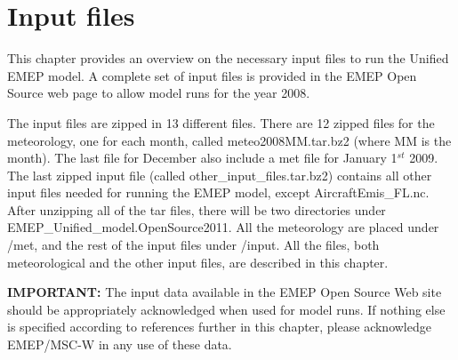 \chapter{Input files}
\label{ch:InputFiles}

This chapter provides an overview on the necessary input files to run 
the Unified EMEP model. A complete set of input files is provided in
the EMEP Open Source web page to allow model runs for the year 2008. 

The input files are zipped in 13 different files. 
There are 12 zipped files for the meteorology, one for each month, called meteo2008MM.tar.bz2 (where MM 
is the month). 
The last file for December also include a met file for January 1$^{st}$ 2009. 
The last zipped input file (called other\_input\_files.tar.bz2) contains all other input 
files needed for running the EMEP model, except AircraftEmis\_FL.nc.
After unzipping all of the tar files, there will be two directories under EMEP\_Unified\_model.OpenSource2011. 
All the meteorology are placed under /met, and the rest of the input files under /input. 
All the files, both meteorological and 
the other input files, are described in this chapter.

{\bf IMPORTANT:} The input data available in the EMEP Open Source Web
site should be appropriately acknowledged when used for model runs.
If nothing else is specified according to references further in this
chapter, please acknowledge EMEP/MSC-W in
any use of these data.



